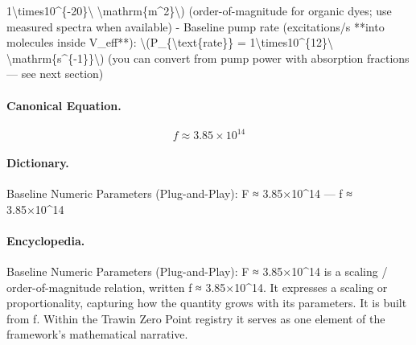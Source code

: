 1\textbackslash{}times10\textasciicircum{}\{-20\}\textbackslash{} \textbackslash{}mathrm\{m\textasciicircum{}2\}\textbackslash{}) (order-of-magnitude for organic dyes; use measured spectra when available) - Baseline pump rate (excitations/s **into molecules inside V\_eff**): \textbackslash{}(P\_\{\textbackslash{}text\{rate\}\} = 1\textbackslash{}times10\textasciicircum{}\{12\}\textbackslash{} \textbackslash{}mathrm\{s\textasciicircum{}\{-1\}\}\textbackslash{}) (you can convert from pump power with absorption fractions — see next section)

\paragraph{Canonical Equation.}
\[
f \approx 3.85\times10^{14}
\]

\paragraph{Dictionary.}
Baseline Numeric Parameters (Plug-and-Play): F ≈ 3.85×10\textasciicircum{}14 — f ≈ 3.85×10\textasciicircum{}14

\paragraph{Encyclopedia.}
Baseline Numeric Parameters (Plug-and-Play): F ≈ 3.85×10\textasciicircum{}14 is a scaling / order-of-magnitude relation, written f ≈ 3.85×10\textasciicircum{}14. It expresses a scaling or proportionality, capturing how the quantity grows with its parameters. It is built from f. Within the Trawin Zero Point registry it serves as one element of the framework's mathematical narrative.
